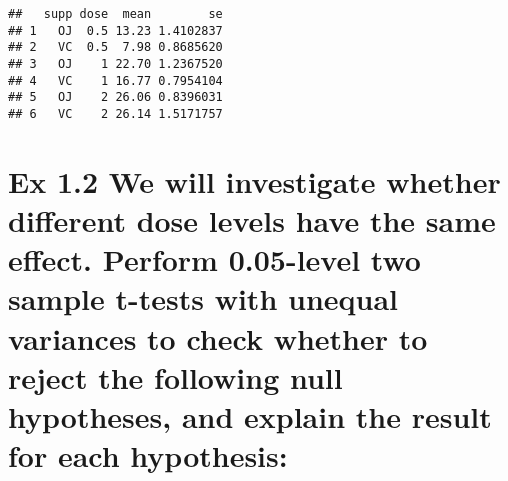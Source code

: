 \documentclass[
]{article}
\newenvironment{Shaded}{\begin{snugshade}}{\end{snugshade}}
\newcommand{\CommentTok}[1]{\textcolor[rgb]{0.56,0.35,0.01}{\textit{#1}}}
\newcommand{\ControlFlowTok}[1]{\textcolor[rgb]{0.13,0.29,0.53}{\textbf{#1}}}
\newcommand{\DataTypeTok}[1]{\textcolor[rgb]{0.13,0.29,0.53}{#1}}
\newcommand{\DecValTok}[1]{\textcolor[rgb]{0.00,0.00,0.81}{#1}}
\newcommand{\KeywordTok}[1]{\textcolor[rgb]{0.13,0.29,0.53}{\textbf{#1}}}
\newcommand{\NormalTok}[1]{#1}
\newcommand{\OperatorTok}[1]{\textcolor[rgb]{0.81,0.36,0.00}{\textbf{#1}}}
\newcommand{\StringTok}[1]{\textcolor[rgb]{0.31,0.60,0.02}{#1}}
\begin{document}
\begin{Shaded}
\end{Shaded}

\begin{verbatim}
##   supp dose  mean        se
## 1   OJ  0.5 13.23 1.4102837
## 2   VC  0.5  7.98 0.8685620
## 3   OJ    1 22.70 1.2367520
## 4   VC    1 16.77 0.7954104
## 5   OJ    2 26.06 0.8396031
## 6   VC    2 26.14 1.5171757
\end{verbatim}

\hypertarget{ex-1.2-we-will-investigate-whether-diuxfb00erent-dose-levels-have-the-same-euxfb00ect.-perform-0.05-level-two-sample-t-tests-with-unequal-variances-to-check-whether-to-reject-the-following-null-hypotheses-and-explain-the-result-for-each-hypothesis}{%
\section{Ex 1.2 We will investigate whether diﬀerent dose levels have
the same eﬀect. Perform 0.05-level two sample t-tests with unequal
variances to check whether to reject the following null hypotheses, and
explain the result for each
hypothesis:}\label{ex-1.2-we-will-investigate-whether-diuxfb00erent-dose-levels-have-the-same-euxfb00ect.-perform-0.05-level-two-sample-t-tests-with-unequal-variances-to-check-whether-to-reject-the-following-null-hypotheses-and-explain-the-result-for-each-hypothesis}}
\end{document}
